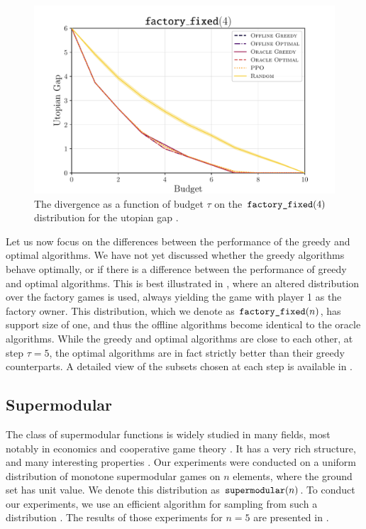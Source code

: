 \begin{figure}[t!]
  \centering
	\includegraphics[width=\stdfigwidth]{figures/exploitability_factory_fixed4.pdf}
	\caption{ The divergence as a function of budget $ \tau $ on the $ \factoryf[4] $ distribution for the utopian gap \citep[][Figure 4]{uradnik2024reducing}.}
	\label{fig: fixed owner factory}
\end{figure}

Let us now focus on the differences between the performance of the greedy and optimal algorithms.
We have not yet discussed whether the greedy algorithms behave optimally, or if there is a difference between the performance of greedy and optimal algorithms.
This is best illustrated in , where an altered distribution over the factory games is used, always yielding the game with player 1 as the factory owner.
This distribution, which we denote as $\factoryf$, has support size of one, and thus the offline algorithms become identical to the oracle algorithms.
While the greedy and optimal algorithms are close to each other, at step $ \tau = 5 $, the optimal algorithms are in fact strictly better than their greedy counterparts.
A detailed view of the subsets chosen at each step is available in .

\subsection{Supermodular}

The class of supermodular functions is widely studied in many fields, most notably in economics and cooperative game theory \citep{grabisch2016set,doi:10.1287/ijoc.15.3.284.16077}.
It has a very rich structure, and many interesting properties \citep{Lovasz1983}.
Our experiments were conducted on a uniform distribution of monotone supermodular games on $ n $ elements, where the ground set has unit value.
We denote this distribution as $ \supermodular $.
To conduct our experiments, we use an efficient algorithm for sampling from such a distribution \citep{9252865}.
The results of those experiments for $ n=5 $ are presented in .

